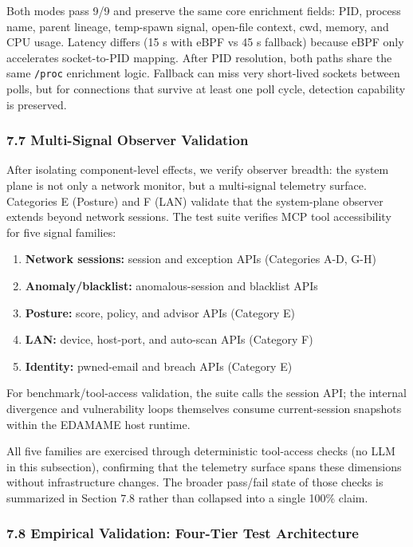 \documentclass[
]{article}
\providecommand{\tightlist}{%
  \setlength{\itemsep}{0pt}\setlength{\parskip}{0pt}}
\begin{document}
Both modes pass 9/9 and preserve the same core enrichment fields: PID,
process name, parent lineage, temp-spawn signal, open-file context, cwd,
memory, and CPU usage. Latency differs (15 s with eBPF vs 45 s fallback)
because eBPF only accelerates socket-to-PID mapping. After PID
resolution, both paths share the same \texttt{/proc} enrichment logic.
Fallback can miss very short-lived sockets between polls, but for
connections that survive at least one poll cycle, detection capability
is preserved.

\subsubsection{7.7 Multi-Signal Observer
Validation}\label{multi-signal-observer-validation}

After isolating component-level effects, we verify observer breadth: the
system plane is not only a network monitor, but a multi-signal telemetry
surface. Categories E (Posture) and F (LAN) validate that the
system-plane observer extends beyond network sessions. The test suite
verifies MCP tool accessibility for five signal families:

\begin{enumerate}
\def\labelenumi{\arabic{enumi}.}
\tightlist
\item
  \textbf{Network sessions:} session and exception APIs (Categories A-D,
  G-H)
\item
  \textbf{Anomaly/blacklist:} anomalous-session and blacklist APIs
\item
  \textbf{Posture:} score, policy, and advisor APIs (Category E)
\item
  \textbf{LAN:} device, host-port, and auto-scan APIs (Category F)
\item
  \textbf{Identity:} pwned-email and breach APIs (Category E)
\end{enumerate}

For benchmark/tool-access validation, the suite calls the session API;
the internal divergence and vulnerability loops themselves consume
current-session snapshots within the EDAMAME host runtime.

All five families are exercised through deterministic tool-access checks
(no LLM in this subsection), confirming that the telemetry surface spans
these dimensions without infrastructure changes. The broader pass/fail
state of those checks is summarized in Section 7.8 rather than collapsed
into a single 100\% claim.

\subsubsection{7.8 Empirical Validation: Four-Tier Test
Architecture}\label{empirical-validation-four-tier-test-architecture}
\end{document}
